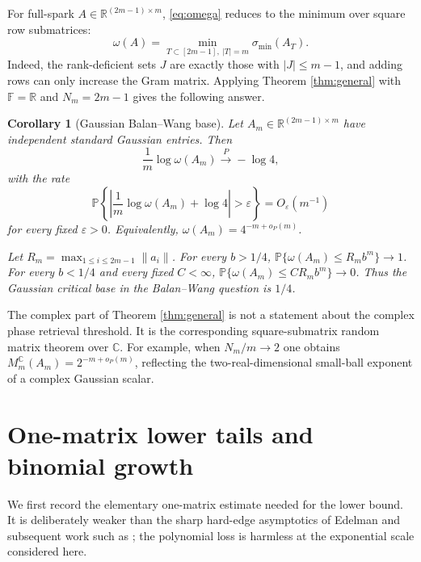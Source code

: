 \documentclass[preprint,12pt]{elsarticle}
\newtheorem{corollary}[theorem]{Corollary}
\newcommand{\R}{\mathbb{R}}
\newcommand{\C}{\mathbb{C}}
\newcommand{\F}{\mathbb{F}}
\newcommand{\PP}{\mathbb{P}}
\begin{document}
For full-spark $A\in\R^{(2m-1)\times m}$, \eqref{eq:omega} reduces to the minimum over square row
submatrices:
\begin{equation}\label{eq:omega-square}
  \omega(A)=\min_{T\subset[2m-1],\ |T|=m}\sigma_{\min}(A_T).
\end{equation}
Indeed, the rank-deficient sets $J$ are exactly those with $|J|\le m-1$, and adding rows can only
increase the Gram matrix. Applying Theorem \ref{thm:general} with $\F=\R$ and $N_m=2m-1$ gives the
following answer.

\begin{corollary}[Gaussian Balan--Wang base]\label{cor:bw}
Let $A_m\in\R^{(2m-1)\times m}$ have independent standard Gaussian entries. Then
\begin{equation}\label{eq:omega-limit}
  \frac{1}{m}\log\omega(A_m)\xrightarrow{P}-\log4,
\end{equation}
with the rate
\begin{equation}\label{eq:omega-rate}
  \PP\left\{\left|\frac{1}{m}\log\omega(A_m)+\log4\right|>\varepsilon\right\}=O_\varepsilon(m^{-1})
\end{equation}
for every fixed $\varepsilon>0$. Equivalently, $\omega(A_m)=4^{-m+o_P(m)}$.

Let $R_m=\max_{1\le i\le 2m-1}\|a_i\|$. For every $b>1/4$, $\PP\{\omega(A_m)\le R_m b^m\}\to1$. For
every $b<1/4$ and every fixed $C<\infty$, $\PP\{\omega(A_m)\le C R_m b^m\}\to0$. Thus the Gaussian
critical base in the Balan--Wang question is $1/4$.
\end{corollary}

The complex part of Theorem \ref{thm:general} is not a statement about the complex phase retrieval
threshold. It is the corresponding square-submatrix random matrix theorem over $\C$. For example, when
$N_m/m\to2$ one obtains $M_m^\C(A_m)=2^{-m+o_P(m)}$, reflecting the two-real-dimensional small-ball
exponent of a complex Gaussian scalar.

\section{One-matrix lower tails and binomial growth}

We first record the elementary one-matrix estimate needed for the lower bound. It is deliberately
weaker than the sharp hard-edge asymptotics of Edelman \cite{Edelman1988} and subsequent work such as
\cite{RudelsonVershynin2009,TaoVu2010}; the polynomial loss is harmless at the exponential scale
considered here.
\end{document}
